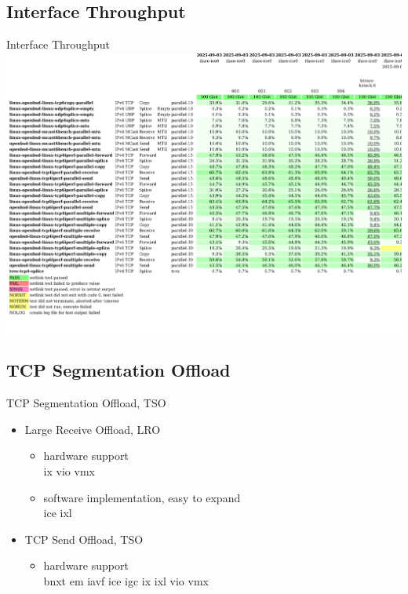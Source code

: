 \documentclass[14pt,aspectratio=169]{beamer}
\begin{document}
\subsection{Interface Throughput}
\begin{frame}{Interface Throughput}
    \includegraphics[height=0.8\textheight]{images/netlink-ice-firefox.pdf}
\end{frame}

\subsection{TCP Segmentation Offload}
\begin{frame}{TCP Segmentation Offload, TSO}
\begin{itemize}
    \item Large Receive Offload, LRO
    \begin{itemize}
	\item hardware support\\
	    ix vio vmx
	\item software implementation, easy to expand\\
	    ice ixl
    \end{itemize}
    \item TCP Send Offload, TSO
    \begin{itemize}
	\item hardware support\\
	    bnxt em iavf ice igc ix ixl vio vmx
    \end{itemize}
\end{itemize}
\end{frame}
\end{document}
